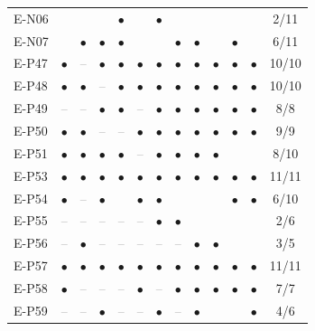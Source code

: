 \begin{longtable}{lccccccccccc c}
    E-N06 &  &  &  & $\bullet$ &  & $\bullet$ &  &  &  &  &  & 2/11 \\
    E-N07 &  & $\bullet$ & $\bullet$ & $\bullet$ &  &  & $\bullet$ & $\bullet$ &  & $\bullet$ &  & 6/11 \\
    E-P47 & $\bullet$ & \textcolor{gray}{--} & $\bullet$ & $\bullet$ & $\bullet$ & $\bullet$ & $\bullet$ & $\bullet$ & $\bullet$ & $\bullet$ & $\bullet$ & 10/10 \\
    E-P48 & $\bullet$ & $\bullet$ & \textcolor{gray}{--} & $\bullet$ & $\bullet$ & $\bullet$ & $\bullet$ & $\bullet$ & $\bullet$ & $\bullet$ & $\bullet$ & 10/10 \\
    E-P49 & \textcolor{gray}{--} & \textcolor{gray}{--} & $\bullet$ & $\bullet$ & \textcolor{gray}{--} & $\bullet$ & $\bullet$ & $\bullet$ & $\bullet$ & $\bullet$ & $\bullet$ & 8/8 \\
    E-P50 & $\bullet$ & $\bullet$ & \textcolor{gray}{--} & \textcolor{gray}{--} & $\bullet$ & $\bullet$ & $\bullet$ & $\bullet$ & $\bullet$ & $\bullet$ & $\bullet$ & 9/9 \\
    E-P51 & $\bullet$ & $\bullet$ & $\bullet$ & $\bullet$ & \textcolor{gray}{--} & $\bullet$ & $\bullet$ & $\bullet$ & $\bullet$ &  &  & 8/10 \\
    E-P53 & $\bullet$ & $\bullet$ & $\bullet$ & $\bullet$ & $\bullet$ & $\bullet$ & $\bullet$ & $\bullet$ & $\bullet$ & $\bullet$ & $\bullet$ & 11/11 \\
    E-P54 & $\bullet$ & \textcolor{gray}{--} & $\bullet$ &  & $\bullet$ & $\bullet$ &  &  &  & $\bullet$ & $\bullet$ & 6/10 \\
    E-P55 & \textcolor{gray}{--} & \textcolor{gray}{--} & \textcolor{gray}{--} & \textcolor{gray}{--} & \textcolor{gray}{--} & $\bullet$ & $\bullet$ &  &  &  &  & 2/6 \\
    E-P56 & \textcolor{gray}{--} & $\bullet$ & \textcolor{gray}{--} & \textcolor{gray}{--} & \textcolor{gray}{--} & \textcolor{gray}{--} & \textcolor{gray}{--} & $\bullet$ & $\bullet$ &  &  & 3/5 \\
    E-P57 & $\bullet$ & $\bullet$ & $\bullet$ & $\bullet$ & $\bullet$ & $\bullet$ & $\bullet$ & $\bullet$ & $\bullet$ & $\bullet$ & $\bullet$ & 11/11 \\
    E-P58 & $\bullet$ & \textcolor{gray}{--} & \textcolor{gray}{--} & \textcolor{gray}{--} & $\bullet$ & \textcolor{gray}{--} & $\bullet$ & $\bullet$ & $\bullet$ & $\bullet$ & $\bullet$ & 7/7 \\
    E-P59 & \textcolor{gray}{--} & \textcolor{gray}{--} & $\bullet$ & \textcolor{gray}{--} & \textcolor{gray}{--} & $\bullet$ & \textcolor{gray}{--} & $\bullet$ &  &  & $\bullet$ & 4/6 \\

\end{longtable}
